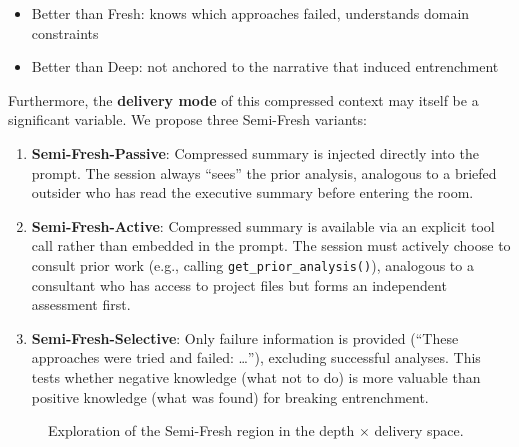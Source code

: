 \documentclass[11pt]{article}
\begin{document}
\begin{itemize}[leftmargin=1.5em]
  \item Better than Fresh: knows which approaches failed, understands domain constraints
  \item Better than Deep: not anchored to the narrative that induced entrenchment
\end{itemize}

Furthermore, the \textbf{delivery mode} of this compressed context may itself be a significant variable. We propose three Semi-Fresh variants:

\begin{enumerate}[label=\arabic*., leftmargin=1.5em]
  \item \textbf{Semi-Fresh-Passive}: Compressed summary is injected directly into the prompt. The session always ``sees'' the prior analysis, analogous to a briefed outsider who has read the executive summary before entering the room.
  \item \textbf{Semi-Fresh-Active}: Compressed summary is available via an explicit tool call rather than embedded in the prompt. The session must actively choose to consult prior work (e.g., calling \texttt{get\_prior\_analysis()}), analogous to a consultant who has access to project files but forms an independent assessment first.
  \item \textbf{Semi-Fresh-Selective}: Only failure information is provided (``These approaches were tried and failed: \ldots''), excluding successful analyses. This tests whether negative knowledge (what not to do) is more valuable than positive knowledge (what was found) for breaking entrenchment.
\end{enumerate}

\begin{figure}[t]
\centering
{}
\caption{Exploration of the Semi-Fresh region in the depth $\times$ delivery space.}
\label{fig:semifresh}
\end{figure}
\end{document}
